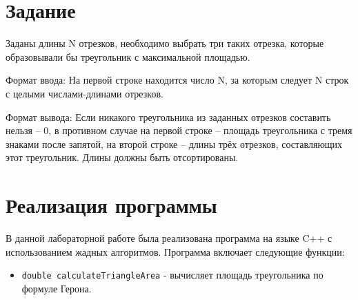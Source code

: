 \documentclass[12pt,a4paper]{article}
\begin{document}
\section*{Задание}
Заданы длины N отрезков, необходимо выбрать три таких отрезка, которые образовывали бы треугольник с максимальной площадью.

Формат ввода:
На первой строке находится число N, за которым следует N строк с целыми числами-длинами отрезков.

Формат вывода:
Если никакого треугольника из заданных отрезков составить нельзя – 0, в противном случае на первой строке – площадь треугольника с тремя знаками после запятой, на второй строке – длины трёх отрезков, составляющих этот треугольник. Длины должны быть отсортированы.

\section*{Реализация программы}
В данной лабораторной работе была реализована программа на языке C++ с использованием жадных алгоритмов. Программа включает следующие функции:

\begin{itemize}
    \item \texttt{double calculateTriangleArea} - вычисляет площадь треугольника по формуле Герона.
\end{itemize}
\end{document}
